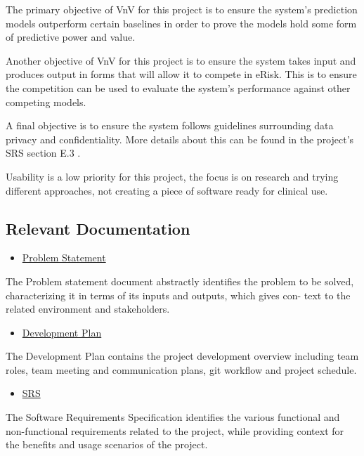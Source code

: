 \documentclass[12pt, titlepage]{article}
\begin{document}
The primary objective of VnV for this project is to ensure the system's prediction models outperform certain baselines in order to prove the models hold some form of predictive power and value.

Another objective of VnV for this project is to ensure the system takes input and produces output in forms that will allow it to compete in eRisk. This is to ensure the competition can be used to evaluate the system's performance against other competing models.

A final objective is to ensure the system follows guidelines surrounding data privacy and confidentiality. More details about this can be found in the project's SRS section E.3 \citep{CogCareCrewSRS}.

Usability is a low priority for this project, the focus is on research and trying different approaches, not creating a piece of software ready for clinical use. 

\subsection{Relevant Documentation}
\begin{itemize}
	\item \href{https://github.com/MichaelBreau/nlp-mentalhealth/blob/main/docs/ProblemStatementAndGoals/ProblemStatement.pdf}{Problem Statement}
\end{itemize}
The Problem statement document abstractly identifies the problem to be
solved, characterizing it in terms of its inputs and outputs, which gives con-
text to the related environment and stakeholders.

\begin{itemize}
	\item \href{https://github.com/MichaelBreau/nlp-mentalhealth/blob/main/docs/DevelopmentPlan/DevelopmentPlan.pdf}{Development Plan}
\end{itemize}
The Development Plan contains the project development overview including
team roles, team meeting and communication plans, git workflow and project
schedule.

\begin{itemize}
	\item \href{https://github.com/MichaelBreau/nlp-mentalhealth/blob/main/docs/SRS-Meyer/index.pdf}{SRS}
\end{itemize}
The Software Requirements Specification identifies the various functional and
non-functional requirements related to the project, while providing context
for the benefits and usage scenarios of the project.
\end{document}
